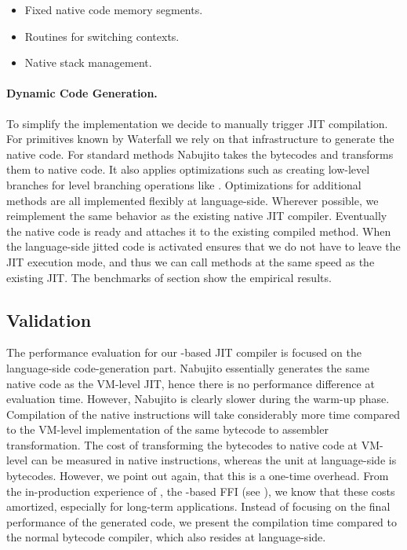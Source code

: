 \begin{itemize}
	\item Fixed native code memory segments.
	\item Routines for switching contexts.
	\item Native stack management.
\end{itemize}

\paragraph{Dynamic Code Generation.}
To simplify the implementation we decide to manually trigger JIT compilation.
For primitives known by Waterfall we rely on that infrastructure to generate the native code.
For standard methods Nabujito takes the bytecodes and transforms them to native code.
It also applies optimizations such as creating low-level branches for \ST level branching operations like .
Optimizations for additional methods are all implemented flexibly at language-side.
Wherever possible, we reimplement the same behavior as the existing native JIT compiler.
Eventually the native code is ready and \B attaches it to the existing compiled method.
When the language-side jitted code is activated \B ensures that we do not have to leave the JIT execution mode, and thus we can call methods at the same speed as the existing JIT.
The benchmarks of section  show the empirical results.

\subsection{Validation}

The performance evaluation for our \B-based JIT compiler is focused on the language-side code-generation part.
Nabujito essentially generates the same native code as the VM-level JIT, hence there is no performance difference at evaluation time.
However, Nabujito is clearly slower during the warm-up phase.
Compilation of the native instructions will take considerably more time compared to the VM-level implementation of the same bytecode to assembler transformation.
The cost of transforming the bytecodes to native code at VM-level can be measured in native instructions, whereas the unit at language-side is bytecodes.
However, we point out again, that this is a one-time overhead.
From the in-production experience of \NB, the \B-based FFI (see ), we know that these costs amortized, especially for long-term applications.
Instead of focusing on the final performance of the generated code, we present the compilation time compared to the normal \PH bytecode compiler, which also resides at language-side.

